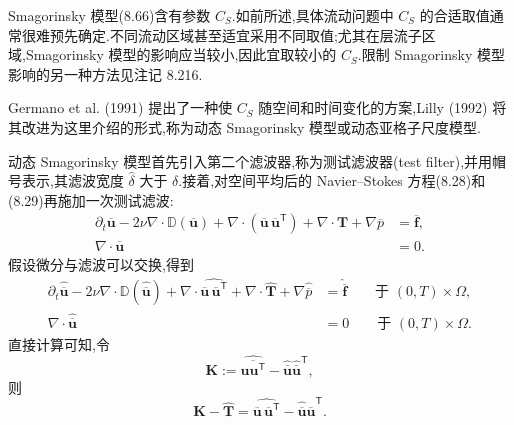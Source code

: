 \begin{note}[动态 Smagorinsky 模型]
\label{note:dynamic-smagorinsky-model}
Smagorinsky 模型(8.66)含有参数 $C_S$.如前所述,具体流动问题中 $C_S$ 的合适取值通常很难预先确定.不同流动区域甚至适宜采用不同取值;尤其在层流子区域,Smagorinsky 模型的影响应当较小,因此宜取较小的 $C_S$.限制 Smagorinsky 模型影响的另一种方法见注记 8.216.

Germano et al. (1991) 提出了一种使 $C_S$ 随空间和时间变化的方案,Lilly (1992) 将其改进为这里介绍的形式,称为动态 Smagorinsky 模型或动态亚格子尺度模型.

动态 Smagorinsky 模型首先引入第二个滤波器,称为测试滤波器(test filter),并用帽号表示,其滤波宽度 $\widehat\delta$ 大于 $\delta$.接着,对空间平均后的 Navier--Stokes 方程(8.28)和(8.29)再施加一次测试滤波:
\[
\begin{aligned}
\partial_t\overline{\bm{u}}
 -2\nu\nabla\cdot\mathbb{D}(\overline{\bm{u}})
 +\nabla\cdot(\overline{\bm{u}}\,\overline{\bm{u}}^{\mathsf T})
 +\nabla\cdot\bm{T}
 +\nabla\overline{p}
 &=\overline{\bm{f}},\\
\nabla\cdot\overline{\bm{u}}&=0.
\end{aligned}
\]
假设微分与滤波可以交换,得到
\[
\begin{aligned}
\partial_t\widehat{\overline{\bm{u}}}
 -2\nu\nabla\cdot\mathbb{D}(\widehat{\overline{\bm{u}}})
 +\nabla\cdot\widehat{
   \overline{\bm{u}}\,\overline{\bm{u}}^{\mathsf T}}
 +\nabla\cdot\widehat{\bm{T}}
 +\nabla\widehat{\overline p}
 &=\widehat{\overline{\bm{f}}}
 \qquad\text{于 }(0,T)\times\Omega,\\
\nabla\cdot\widehat{\overline{\bm{u}}}&=0
 \qquad\text{于 }(0,T)\times\Omega.
\end{aligned}
\]
直接计算可知,令
\[
\bm{K}:=
\widehat{\overline{\bm{u}\bm{u}^{\mathsf T}}}
 -\widehat{\overline{\bm{u}}}
  \widehat{\overline{\bm{u}}}^{\mathsf T},
\]
则
\begin{equation}\label{eq:dynamic-smagorinsky-test-filter-identity}
\bm{K}-\widehat{\bm{T}}
=\widehat{\overline{\bm{u}}\,\overline{\bm{u}}^{\mathsf T}}
 -\widehat{\overline{\bm{u}}}
  \widehat{\overline{\bm{u}}}^{\mathsf T}.
\end{equation}


\end{note}
